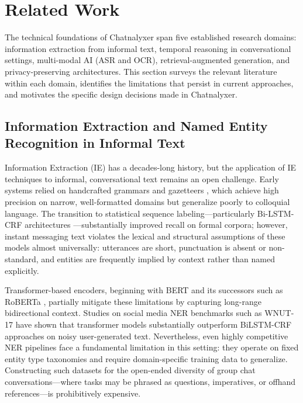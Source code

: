 \section{Related Work}
\label{sec:related_work}

The technical foundations of Chatnalyxer span five established research domains: information extraction from informal text, temporal reasoning in conversational settings, multi-modal AI (ASR and OCR), retrieval-augmented generation, and privacy-preserving architectures. This section surveys the relevant literature within each domain, identifies the limitations that persist in current approaches, and motivates the specific design decisions made in Chatnalyxer.

\subsection{Information Extraction and Named Entity Recognition in Informal Text}

Information Extraction (IE) has a decades-long history, but the application of IE techniques to informal, conversational text remains an open challenge. Early systems relied on handcrafted grammars and gazetteers \cite{chiticariu2013}, which achieve high precision on narrow, well-formatted domains but generalize poorly to colloquial language. The transition to statistical sequence labeling—particularly Bi-LSTM-CRF architectures \cite{lample2016}—substantially improved recall on formal corpora; however, instant messaging text violates the lexical and structural assumptions of these models almost universally: utterances are short, punctuation is absent or non-standard, and entities are frequently implied by context rather than named explicitly.

Transformer-based encoders, beginning with BERT \cite{bert2019} and its successors such as RoBERTa \cite{liu2019roberta}, partially mitigate these limitations by capturing long-range bidirectional context. Studies on social media NER benchmarks such as WNUT-17 \cite{derczynski2017} have shown that transformer models substantially outperform BiLSTM-CRF approaches on noisy user-generated text. Nevertheless, even highly competitive NER pipelines face a fundamental limitation in this setting: they operate on fixed entity type taxonomies and require domain-specific training data to generalize. Constructing such datasets for the open-ended diversity of group chat conversations—where tasks may be phrased as questions, imperatives, or offhand references—is prohibitively expensive.

